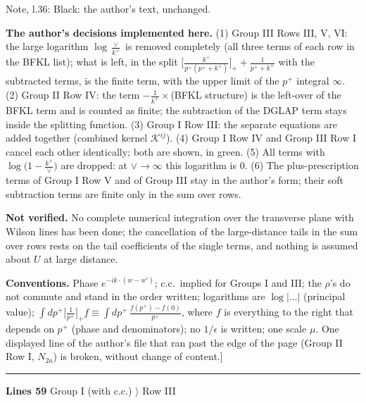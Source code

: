\documentclass[10pt]{article}
\newenvironment{notebox}{\def\FrameCommand{{\color{notebar}\vrule width 1.5pt}\hspace{6pt}}\MakeFramed{\advance\hsize-\width\FrameRestore}\small}{\endMakeFramed}
\begin{document}
\begin{notebox}\textsf{\small Note, l.36:} Black: the author's text, unchanged.\par\noindent\textbf{The author's decisions implemented here.} (1) Group III Rows III, V, VI: the large logarithm $\log\frac{\vee}{k^{+}}$ is removed completely (all three terms of each row in the BFKL list); what is left, in the split $\big[\frac{k^{+}}{p^{+}(p^{+}+k^{+})}\big]_{+}+\frac{1}{p^{+}+k^{+}}$ with the subtracted terms, is the finite term, with the upper limit of the $p^{+}$ integral $\infty$. (2) Group II Row IV: the term $-\frac{1}{k^{+}}\times$(BFKL structure) is the left-over of the BFKL term and is counted as finite; the subtraction of the DGLAP term stays inside the splitting function. (3) Group I Row III: the separate equations are added together (combined kernel $\mathcal{K}^{ij}$). (4) Group I Row IV and Group III Row I cancel each other identically; both are shown, in green. (5) All terms with $\log\big(1-\frac{k^{+}}{\vee}\big)$ are dropped: at $\vee\to\infty$ this logarithm is $0$. (6) The plus-prescription terms of Group I Row V and of Group III stay in the author's form; their soft subtraction terms are finite only in the sum over rows.\par\noindent\textbf{Not verified.} No complete numerical integration over the transverse plane with Wilson lines has been done; the cancellation of the large-distance tails in the sum over rows rests on the tail coefficients of the single terms, and nothing is assumed about $U$ at large distance.\par\noindent\textbf{Conventions.} Phase $e^{-ik\cdot(w-w')}$; c.c.\ implied for Groups I and III; the $\rho$'s do not commute and stand in the order written; logarithms are $\log|\dots|$ (principal value); $\int dp^{+}\big[\frac{1}{p^{+}}\big]_{+}f\equiv\int dp^{+}\,\frac{f(p^{+})-f(0)}{p^{+}}$, where $f$ is everything to the right that depends on $p^{+}$ (phase and denominators); no $1/\epsilon$ is written; one scale $\mu$. One displayed line of the author's file that ran past the edge of the page (Group II Row I, $N_{2a}$) is broken, without change of content.]\end{notebox}
\noindent\rule{\linewidth}{0.3pt}\par\noindent\textbf{Lines 59} \quad \textsf{Group I (with c.c.) $\rangle$ Row III}\par
\end{document}
